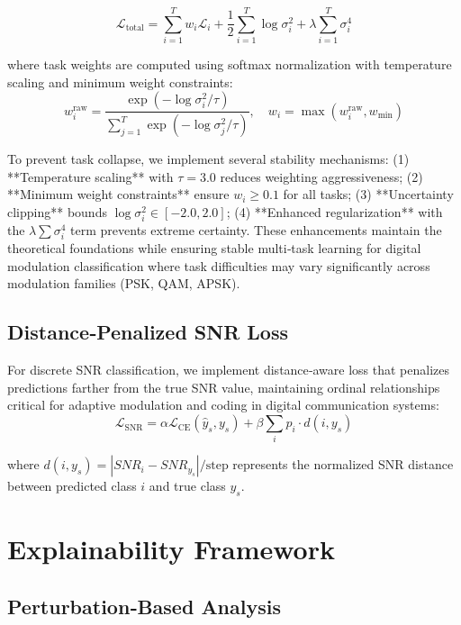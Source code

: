 \documentclass{ELSP}
\begin{document}
\begin{equation}
\mathcal{L}_{\text{total}} = \sum_{i=1}^{T} w_i \mathcal{L}_i + \frac{1}{2}\sum_{i=1}^{T} \log \sigma_i^2 + \lambda \sum_{i=1}^{T} \sigma_i^4
\end{equation}

where task weights are computed using softmax normalization with temperature scaling and minimum weight constraints:
\begin{equation}
w_i^{\text{raw}} = \frac{\exp(-\log \sigma_i^2 / \tau)}{\sum_{j=1}^{T} \exp(-\log \sigma_j^2 / \tau)}, \quad w_i = \max(w_i^{\text{raw}}, w_{\text{min}})
\end{equation}

To prevent task collapse, we implement several stability mechanisms: (1) **Temperature scaling** with $\tau = 3.0$ reduces weighting aggressiveness; (2) **Minimum weight constraints** ensure $w_i \geq 0.1$ for all tasks; (3) **Uncertainty clipping** bounds $\log \sigma_i^2 \in [-2.0, 2.0]$; (4) **Enhanced regularization** with the $\lambda \sum \sigma_i^4$ term prevents extreme certainty. These enhancements maintain the theoretical foundations while ensuring stable multi‑task learning for digital modulation classification where task difficulties may vary significantly across modulation families (PSK, QAM, APSK).

\subsection{Distance‑Penalized SNR Loss}

For discrete SNR classification, we implement distance‑aware loss that penalizes predictions farther from the true SNR value, maintaining ordinal relationships critical for adaptive modulation and coding in digital communication systems:
\begin{equation}
\mathcal{L}_{\text{SNR}} = \alpha \mathcal{L}_{\text{CE}}(\hat{y}_s, y_s) + \beta \sum_{i} p_i \cdot d(i, y_s)
\end{equation}

where $d(i, y_s) = |SNR_i - SNR_{y_s}| / \text{step}$ represents the normalized SNR distance between predicted class $i$ and true class $y_s$.

\section{Explainability Framework}

\subsection{Perturbation‑Based Analysis}
\end{document}
